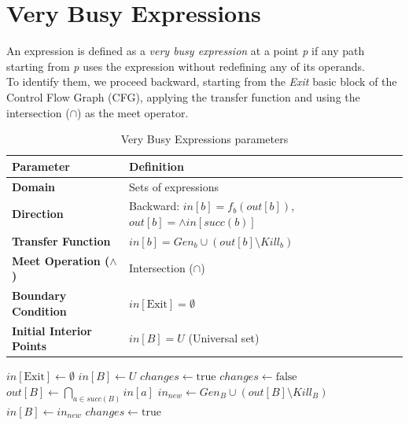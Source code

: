 \section{Very Busy Expressions}

An expression is defined as a \textit{very busy expression} at a point \textit{p} if any path starting from \textit{p} uses the expression without redefining any of its operands. \\
To identify them, we proceed backward, starting from the \textit{Exit} basic block of the Control Flow Graph (CFG), applying the transfer function and using the intersection ($\cap$) as the meet operator.

\begin{table}[H] %
\centering
\renewcommand{\arraystretch}{1.5}
\begin{tabular}{ll}
\toprule
\textbf{Parameter} & \textbf{Definition} \\
\midrule
\textbf{Domain} & Sets of expressions \\
\textbf{Direction} & Backward: $in[b] = f_b(out[b])$, $out[b] = \wedge in[succ(b)]$ \\
\textbf{Transfer Function} & $in[b] = Gen_b \cup (out[b] \setminus Kill_b)$ \\
\textbf{Meet Operation ($\wedge$)} & Intersection ($\cap$) \\
\textbf{Boundary Condition} & $in[\text{Exit}] = \emptyset$ \\
\textbf{Initial Interior Points} & $in[B] = U$ (Universal set) \\
\bottomrule
\end{tabular}
\caption{Very Busy Expressions parameters}
\end{table}

\begin{algorithm}[H] %
\caption{Very Busy Expressions Algorithm}
\begin{algorithmic}[1]
\State $in[\text{Exit}] \gets \emptyset$
    \State $in[B] \gets U$
\EndFor
\Statex
\State $changes \gets \text{true}$
    \State $changes \gets \text{false}$
        \State $out[B] \gets \bigcap_{a \in succ(B)} in[a]$
        \State $in_{new} \gets Gen_B \cup (out[B] \setminus Kill_B)$
            \State $in[B] \gets in_{new}$
            \State $changes \gets \text{true}$
        \EndIf
    \EndFor
\EndWhile
\end{algorithmic}
\end{algorithm}

